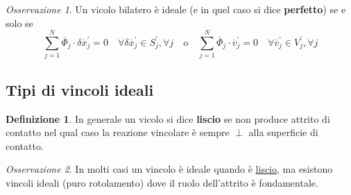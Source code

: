 \documentclass{book}
\theoremstyle{plain}
\theoremstyle{plain}
\theoremstyle{plain}
\theoremstyle{plain}
\theoremstyle{plain}
\theoremstyle{definition}
\newtheorem{defi}{Definizione}[chapter]
\theoremstyle{remark}
\newtheorem*{oss}{Osservazione}
\theoremstyle{definition}
\begin{document}
\begin{oss}
    Un vicolo bilatero è ideale (e in quel caso si dice \textbf{perfetto}) se e solo se
    \begin{displaymath}
        \sum_{j=1}^{N} \overline{\Phi}_{j} \cdot \delta \overline{x}_{j}^{\prime} = 0 \quad \forall \delta \overline{x}_{j}^{\prime} \in S_{j}^{\prime}, \forall j \quad \text{o} \quad \sum_{j=1}^{N} \overline{\Phi}_{j} \cdot \overline{v}_{j}^{\prime} = 0 \quad \forall \overline{v}_{j}^{\prime} \in V_{j}^{\prime}, \forall j
    \end{displaymath}
\end{oss}

\subsection{Tipi di vincoli ideali}

\begin{defi}
    In generale un vicolo si dice \textbf{liscio} se non produce attrito di contatto nel qual caso la reazione vincolare è sempre $\perp$ alla superficie di contatto.
\end{defi}

\begin{oss}
    In molti casi un vincolo è ideale quando è \underline{liscio}, ma esistono vincoli ideali (puro rotolamento) dove il ruolo dell'attrito è fondamentale.
\end{oss}
\end{document}
